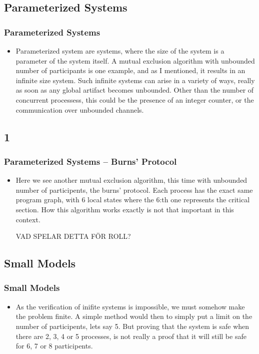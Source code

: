 \documentclass[handout]{beamer}
\begin{document}
\begin{footnotesize}
\subsection{Parameterized Systems}
\begin{frame}
  \frametitle{Parameterized Systems}
  \begin{itemize}
  \item
  Parameterized system are systems, where the size of the system is a parameter of the system itself. A mutual exclusion algorithm with unbounded number of participants is one example, and as I mentioned, it results in an infinite size system. Such infinite systems can arise in a variety of ways, really as soon as any global artifact becomes unbounded. Other than the number of concurrent processess, this could be the presence of an integer counter, or the communication over unbounded channels.

  \end{itemize}
\end{frame}

\subsection*{1}
\begin{frame}
  \frametitle{Parameterized Systems -- Burns' Protocol}
\begin{itemize}
\item
Here we see another mutual exclusion algorithm, this time with unbounded number of participents, the burns' protocol. Each process has the exact same program graph, with 6 local states where the 6:th one represents the critical section. How this algorithm works exactly is not that important in this context.

VAD SPELAR DETTA FÖR ROLL?

\end{itemize}
\end{frame}


\subsection{Small Models}
\begin{frame}
  \frametitle{Small Models}
  \begin{itemize}
  \item
As the verification of inifite systems is impossible, we must somehow make the problem finite. A simple method would then to simply put a limit on the number of participents, lets say 5. But proving that the system is safe when there are 2, 3, 4 or 5 processes, is not really a proof that it will still be safe for 6, 7 or 8 participents.


\end{itemize}
\end{frame}
\end{footnotesize}
\end{document}

